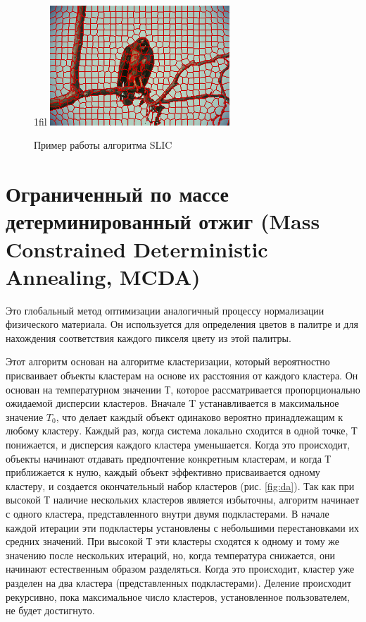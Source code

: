 \documentclass[a4paper,12pt]{report}
\makeatletter
\newcommand*{\centerfloat}{%
  \parindent \z@
  \leftskip \z@ \@plus 1fil \@minus \textwidth
  \rightskip\leftskip
  \parfillskip \z@skip}
\makeatother
\begin{document}
\begin{figure}
    \centerfloat
    \includegraphics[width=0.6\textwidth]{pixel/slic.png}
    \caption{Пример работы алгоритма SLIC \citep{slic}}
    \label{fig:slic}
\end{figure}

\section{Ограниченный по массе детерминированный отжиг (Mass Constrained Deterministic Annealing, MCDA)}

Это глобальный метод оптимизации аналогичный процессу нормализации физического материала. Он используется для определения цветов в палитре и для нахождения соответствия каждого пикселя цвету из этой палитры.

Этот алгоритм основан на алгоритме кластеризации, который вероятностно присваивает объекты кластерам на основе их расстояния от каждого кластера. Он основан на температурном значении Т, которое рассматривается пропорционально ожидаемой дисперсии кластеров. Вначале T устанавливается в максимальное значение $T_0$, что делает каждый объект одинаково вероятно принадлежащим к любому кластеру. Каждый раз, когда система локально сходится в одной точке, $Т$ понижается, и дисперсия каждого кластера уменьшается. Когда это происходит, объекты начинают отдавать предпочтение конкретным кластерам, и когда $Т$ приближается к нулю, каждый объект эффективно присваивается одному кластеру, и создается окончательный набор кластеров (рис. \ref{fig:da}). Так как при высокой $Т$ наличие нескольких кластеров является избыточны, алгоритм начинает с одного кластера, представленного внутри двумя подкластерами. В начале каждой итерации эти подкластеры установлены с небольшими перестановками их средних значений. При высокой $Т$ эти кластеры сходятся к одному и тому же значению после нескольких итераций, но, когда температура снижается, они начинают естественным образом разделяться. Когда это происходит, кластер уже разделен на два кластера (представленных подкластерами). Деление происходит рекурсивно, пока максимальное число кластеров, установленное пользователем, не будет достигнуто.
\end{document}
